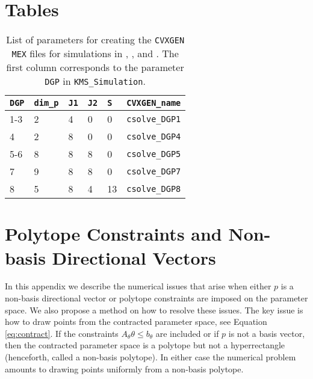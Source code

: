 \documentclass[12pt]{article}
\def\code#1{\texttt{#1}}
\begin{document}
\begin{appendices}

\section{Tables} \label{sec:tab}

\begin{table}[h!]
\centering
\begin{tabular}{llllll}
\hline
\code{DGP} & \code{dim\_p} & \code{J1} & \code{J2} & \code{S} & \code{CVXGEN\_name} \\ \hline
1-3          & 2               & 4           & 0           & 0          & \code{csolve\_DGP1} \\
4            & 2               & 8           & 0           & 0          & \code{csolve\_DGP4} \\
5-6          & 8               & 8           & 8           & 0          & \code{csolve\_DGP5} \\
7            & 9               & 8           & 8           & 0          & \code{csolve\_DGP7} \\
8            & 5               & 8           & 4           & 13         & \code{csolve\_DGP8} \\ \hline
\end{tabular}
\caption{List of parameters for creating the \code{CVXGEN MEX} files for simulations in \protect{}, \protect{}, and \protect{}.  The first column corresponds to the parameter \code{DGP} in \code{KMS\_Simulation}.}
\label{tab:cvxgenparams}
\end{table}



\section{Polytope Constraints and Non-basis Directional Vectors} \label{appendix:polytope}
In this appendix we describe the numerical issues that arise when either $p$ is a non-basis directional vector or polytope constraints are imposed on the parameter space. We also propose a method on how to resolve these issues.  The key issue is how to draw points from the contracted parameter space, see Equation \eqref{eq:contract}. If the constraints $A_{\theta} \theta \leq b_{\theta}$ are included or if  $p$ is not a basis vector, then the contracted parameter space is a polytope but not a hyperrectangle (henceforth, called a non-basis polytope).   In either case the numerical problem amounts to drawing points uniformly from a non-basis polytope.


\end{appendices}
\end{document}
